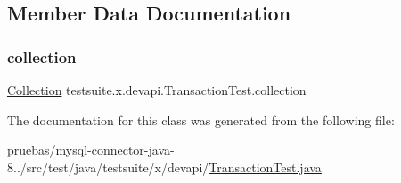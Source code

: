 \subsection{Member Data Documentation}
\mbox{\label{classtestsuite_1_1x_1_1devapi_1_1_transaction_test_a0d7538a90a1ac03709e7a3f2efb25968}} 
\subsubsection{\texorpdfstring{collection}{collection}}
{\footnotesize\ttfamily \mbox{\hyperlink{interfacecom_1_1mysql_1_1cj_1_1xdevapi_1_1_collection}{Collection}} testsuite.\+x.\+devapi.\+Transaction\+Test.\+collection\hspace{0.3cm}{\ttfamily [protected]}}



The documentation for this class was generated from the following file\+:\begin{DoxyCompactItemize}
\item 
pruebas/mysql-\/connector-\/java-\/8../src/test/java/testsuite/x/devapi/\mbox{\hyperlink{x_2devapi_2_transaction_test_8java}{Transaction\+Test.\+java}}\end{DoxyCompactItemize}
